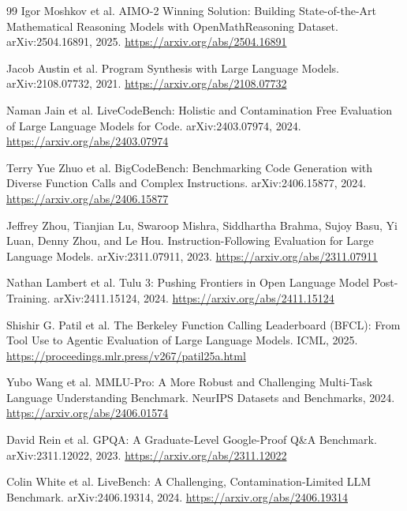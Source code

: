 \documentclass[11pt]{article}
\begin{document}
\begin{thebibliography}{99}
Igor Moshkov et al.
\newblock AIMO-2 Winning Solution: Building State-of-the-Art Mathematical Reasoning Models with OpenMathReasoning Dataset.
\newblock arXiv:2504.16891, 2025.
\newblock \url{https://arxiv.org/abs/2504.16891}

Jacob Austin et al.
\newblock Program Synthesis with Large Language Models.
\newblock arXiv:2108.07732, 2021.
\newblock \url{https://arxiv.org/abs/2108.07732}

Naman Jain et al.
\newblock LiveCodeBench: Holistic and Contamination Free Evaluation of Large Language Models for Code.
\newblock arXiv:2403.07974, 2024.
\newblock \url{https://arxiv.org/abs/2403.07974}

Terry Yue Zhuo et al.
\newblock BigCodeBench: Benchmarking Code Generation with Diverse Function Calls and Complex Instructions.
\newblock arXiv:2406.15877, 2024.
\newblock \url{https://arxiv.org/abs/2406.15877}

Jeffrey Zhou, Tianjian Lu, Swaroop Mishra, Siddhartha Brahma, Sujoy Basu, Yi Luan, Denny Zhou, and Le Hou.
\newblock Instruction-Following Evaluation for Large Language Models.
\newblock arXiv:2311.07911, 2023.
\newblock \url{https://arxiv.org/abs/2311.07911}

Nathan Lambert et al.
\newblock Tulu 3: Pushing Frontiers in Open Language Model Post-Training.
\newblock arXiv:2411.15124, 2024.
\newblock \url{https://arxiv.org/abs/2411.15124}

Shishir G. Patil et al.
\newblock The Berkeley Function Calling Leaderboard (BFCL): From Tool Use to Agentic Evaluation of Large Language Models.
\newblock ICML, 2025.
\newblock \url{https://proceedings.mlr.press/v267/patil25a.html}

Yubo Wang et al.
\newblock MMLU-Pro: A More Robust and Challenging Multi-Task Language Understanding Benchmark.
\newblock NeurIPS Datasets and Benchmarks, 2024.
\newblock \url{https://arxiv.org/abs/2406.01574}

David Rein et al.
\newblock GPQA: A Graduate-Level Google-Proof Q\&A Benchmark.
\newblock arXiv:2311.12022, 2023.
\newblock \url{https://arxiv.org/abs/2311.12022}

Colin White et al.
\newblock LiveBench: A Challenging, Contamination-Limited LLM Benchmark.
\newblock arXiv:2406.19314, 2024.
\newblock \url{https://arxiv.org/abs/2406.19314}


\end{thebibliography}
\end{document}
